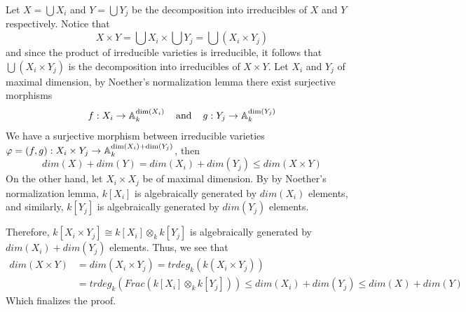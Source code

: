 \documentclass{article}
\begin{document}
\newpage
Let $X=\bigcup X_{i}$ and $Y=\bigcup Y_{j}$ be the decomposition into irreducibles of $X$ and $Y$
respectively. Notice that
\begin{equation*}
    X\times Y=\bigcup X_{i}\times\bigcup Y_{j}=\bigcup(X_{i}\times Y_{j})
\end{equation*}
and since the product of irreducible varieties is irreducible, it follows that 
$\bigcup(X_{i}\times Y_{j})$ is the decomposition into irreducibles of $X\times Y$. Let $X_{i}$ 
and $Y_{j}$ of maximal dimension, by Noether's normalization lemma there exist surjective 
morphisms
\begin{equation*}
    f:X_{i}\to\mathbb{A}_{k}^{\dim(X_{i})} \hspace{4mm}\text{and}\hspace{4mm} g:Y_{j}\to\mathbb{A}_{k}^{\dim(Y_{j})}
\end{equation*}
We have a surjective morphism between irreducible varieties
$\varphi=(f,g):X_{i}\times Y_{j}\to\mathbb{A}_{k}^{\dim(X_{i})+\dim(Y_{j})}$, then
\begin{equation*}
    dim(X)+dim(Y)=dim(X_{i})+dim(Y_{j})\leq dim(X\times Y)
\end{equation*}
On the other hand, let $X_{i}\times X_{j}$ be of maximal dimension. By by Noether's normalization 
lemma, $k[X_{i}]$ is algebraically generated by $dim(X_{i})$ elements, and similarly, $k[Y_{j}]$ 
is algebraically generated by $dim(Y_{j})$ elements.

\vspace{2mm}
Therefore, $k[X_{i}\times Y_{j}]\cong k[X_{i}]\otimes_{k} k[Y_{j}]$ is algebraically generated by
$dim(X_{i})+dim(Y_{j})$ elements. Thus, we see that
\begin{align*}
    dim(X\times Y) &= dim(X_{i}\times Y_{j})=trdeg_{k}(k(X_{i}\times Y_{j})) \\
    &= trdeg_{k}(Frac(k[X_{i}]\otimes_{k} k[Y_{j}]))\leq dim(X_{i})+dim(Y_{j})\leq dim(X)+dim(Y)
\end{align*}
Which finalizes the proof.
\end{document}
